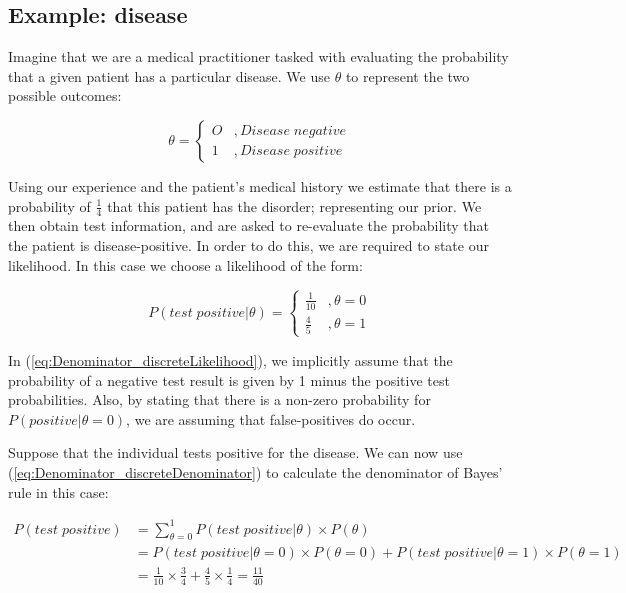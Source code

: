 \documentclass[11pt,fullpage]{book}
\begin{document}
\subsection{Example: disease}\label{sec:Denominator_discreteExample}
Imagine that we are a medical practitioner tasked with evaluating the probability that a given patient has a particular disease. We use $\theta$ to represent the two possible outcomes: 

\begin{equation}
\theta =
\begin{cases}
O & , Disease \; negative \\
1 & ,  Disease \; positive
\end{cases}
\end{equation}

Using our experience and the patient's medical history we estimate that there is a probability of $\frac{1}{4}$ that this patient has the disorder; representing our prior. We then obtain test information, and are asked to re-evaluate the probability that the patient is disease-positive. In order to do this, we are required to state our likelihood. In this case we choose a likelihood of the form:

\begin{equation}\label{eq:Denominator_discreteLikelihood}
P(test\;positive|\theta) =
\begin{cases}
\frac{1}{10} & , \theta=0\\
\frac{4}{5} & ,  \theta=1
\end{cases}
\end{equation}

In (\ref{eq:Denominator_discreteLikelihood}), we implicitly assume that the probability of a negative test result is given by 1 minus the positive test probabilities. Also, by stating that there is a non-zero probability for $P(positive|\theta=0)$, we are assuming that false-positives do occur.

Suppose that the individual tests positive for the disease. We can now use (\ref{eq:Denominator_discreteDenominator}) to calculate the denominator of Bayes' rule in this case:

\begin{equation}
\begin{align}
P(test\; positive) &= \sum\limits_{\theta=0}^{1} P(test\; positive|\theta) \times P(\theta)\\
&= P(test\; positive|\theta=0) \times P(\theta=0) + P(test\; positive|\theta=1) \times P(\theta=1)\\
&= \frac{1}{10} \times \frac{3}{4} + \frac{4}{5} \times \frac{1}{4} = \frac{11}{40}
\end{align}
\end{equation}
\end{document}
